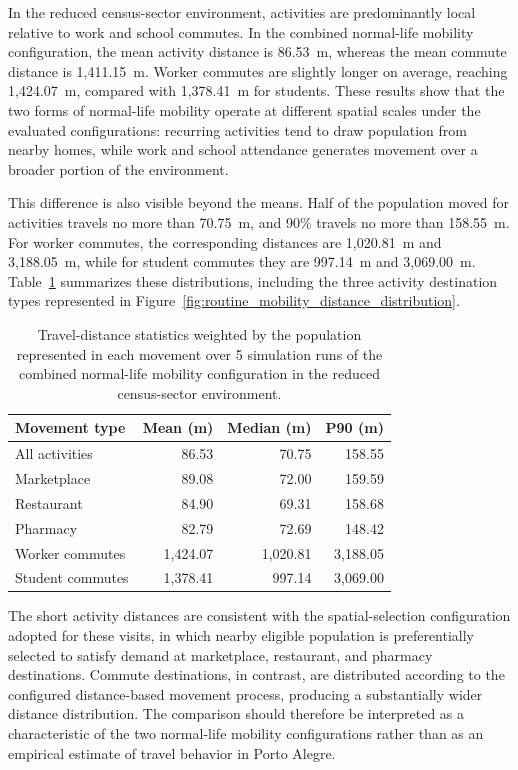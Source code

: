 In the reduced census-sector environment, activities are predominantly local relative to work and school commutes. In the combined normal-life mobility configuration, the mean activity distance is 86.53~m, whereas the mean commute distance is 1,411.15~m. Worker commutes are slightly longer on average, reaching 1,424.07~m, compared with 1,378.41~m for students. These results show that the two forms of normal-life mobility operate at different spatial scales under the evaluated configurations: recurring activities tend to draw population from nearby homes, while work and school attendance generates movement over a broader portion of the environment.

This difference is also visible beyond the means. Half of the population moved for activities travels no more than 70.75~m, and 90\% travels no more than 158.55~m. For worker commutes, the corresponding distances are 1,020.81~m and 3,188.05~m, while for student commutes they are 997.14~m and 3,069.00~m. Table~\ref{tbl:routine_mobility_distance_summary} summarizes these distributions, including the three activity destination types represented in Figure~\ref{fig:routine_mobility_distance_distribution}.

\begin{table}[ht]
\centering
\caption{Travel-distance statistics weighted by the population represented in each movement over 5 simulation runs of the combined normal-life mobility configuration in the reduced census-sector environment.}
\label{tbl:routine_mobility_distance_summary}
\begin{tabular}{@{}lrrr@{}}
\toprule
\textbf{Movement type} &
\textbf{Mean (m)} &
\textbf{Median (m)} &
\textbf{P90 (m)} \\
\midrule
All activities & 86.53 & 70.75 & 158.55 \\
\quad Marketplace & 89.08 & 72.00 & 159.59 \\
\quad Restaurant & 84.90 & 69.31 & 158.68 \\
\quad Pharmacy & 82.79 & 72.69 & 148.42 \\
Worker commutes & 1,424.07 & 1,020.81 & 3,188.05 \\
Student commutes & 1,378.41 & 997.14 & 3,069.00 \\
\bottomrule
\end{tabular}
\end{table}

The short activity distances are consistent with the spatial-selection configuration adopted for these visits, in which nearby eligible population is preferentially selected to satisfy demand at marketplace, restaurant, and pharmacy destinations. Commute destinations, in contrast, are distributed according to the configured distance-based movement process, producing a substantially wider distance distribution. The comparison should therefore be interpreted as a characteristic of the two normal-life mobility configurations rather than as an empirical estimate of travel behavior in Porto Alegre.

